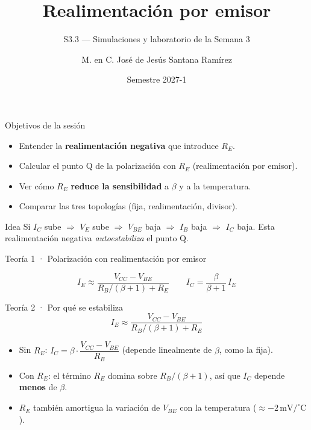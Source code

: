 \documentclass[aspectratio=169]{beamer}
\title[S3.3 · Realimentación por emisor]{Realimentación por emisor}
\subtitle{S3.3 — Simulaciones y laboratorio de la Semana 3}
\institute{Licenciatura en Ingeniería Aeroespacial\\ UNAM · ENES Unidad Juriquilla}
\author{M. en C. José de Jesús Santana Ramírez}
\date{Semestre 2027-1}
\begin{document}
\begin{frame}[plain]
  \titlepage
\end{frame}

\begin{frame}{Objetivos de la sesión}
  \begin{itemize}
    \item Entender la \textbf{realimentación negativa} que introduce $R_E$.
    \item Calcular el punto Q de la polarización con $R_E$ (realimentación por emisor).
    \item Ver cómo $R_E$ \textbf{reduce la sensibilidad} a $\beta$ y a la temperatura.
    \item Comparar las tres topologías (fija, realimentación, divisor).
  \end{itemize}
  \pause
  \begin{block}{Idea}
    Si $I_C$ sube $\Rightarrow$ $V_E$ sube $\Rightarrow$ $V_{BE}$ baja $\Rightarrow$ $I_B$ baja $\Rightarrow$ $I_C$ baja.
    Esta realimentación negativa \emph{autoestabiliza} el punto Q.
  \end{block}
\end{frame}

\begin{frame}{Teoría 1 · Polarización con realimentación por emisor}
  \begin{center}
  \end{center}
  \[
    I_E \approx \frac{V_{CC}-V_{BE}}{R_B/(\beta+1) + R_E}
    \qquad
    I_C = \frac{\beta}{\beta+1}\,I_E
  \]
\end{frame}

\begin{frame}{Teoría 2 · Por qué se estabiliza}
  \[
    I_E \approx \frac{V_{CC}-V_{BE}}{R_B/(\beta+1) + R_E}
  \]
  \pause
  \begin{itemize}
    \item Sin $R_E$: $I_C = \beta\cdot\dfrac{V_{CC}-V_{BE}}{R_B}$ (depende linealmente de $\beta$, como la fija).
    \item Con $R_E$: el término $R_E$ domina sobre $R_B/(\beta+1)$, así que $I_C$ depende \textbf{menos} de $\beta$.
    \item $R_E$ también amortigua la variación de $V_{BE}$ con la temperatura ($\approx -2\,\text{mV}/^\circ\text{C}$).
  \end{itemize}
\end{frame}
\end{document}
